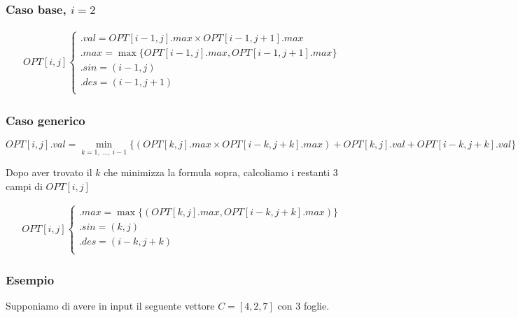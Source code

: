 \subsubsection*{Caso base, $i = 2$}

\begin{align*}
	OPT[i, j]	
	\begin{cases}
		.val = OPT[i - 1, j].max \times OPT[i - 1, j + 1].max\\                                                                                          
		.max = \max\{OPT[i - 1, j].max, OPT[i - 1, j + 1].max\}\\
		.sin = (i - 1, j)\\
		.des = (i - 1, j + 1)\\
	\end{cases}                                                                                            
\end{align*}

\subsubsection*{Caso generico}

$$
OPT[i, j].val = \min_{k = 1,\ \dots,\ i - 1}\{(OPT[k, j].max \times OPT[i - k, j + k].max) + OPT[k, j].val + OPT[i - k, j + k].val\}
$$

Dopo aver trovato il $k$ che minimizza la formula sopra, calcoliamo i restanti 3 campi di $OPT[i, j]$

\begin{align*}
	OPT[i, j]	
	\begin{cases}                                                                                          
		.max = \max\{(OPT[k, j].max, OPT[i - k, j + k].max)\}\\
		.sin = (k, j)\\
		.des = (i - k, j + k)\\
	\end{cases}                                                                                            
\end{align*}



\subsubsection*{Esempio}

Supponiamo di avere in input il seguente vettore $C = [4, 2, 7]$ con 3 foglie.

